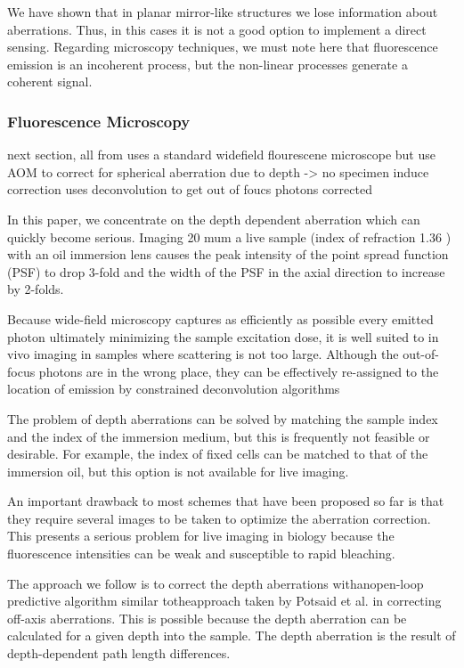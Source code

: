 We have shown that in planar mirror-like structures we lose information about aberrations. Thus, in this cases it is not a good option to implement a direct sensing. Regarding microscopy techniques, we must note here that fluorescence emission is an incoherent process, but the non-linear processes generate a coherent signal.


\subsubsection{Fluorescence Microscopy}
\label{sec:FlourescnecMicroscopy}

next section, all from \cite{wide_AOM_FM_spehrical_correction} uses a 
standard widefield flourescene microscope but use AOM to correct for 
spherical aberration due to depth -> no specimen induce correction
uses deconvolution to get out of foucs photons corrected

In this paper, we concentrate on the depth dependent aberration which can 
quickly become serious. Imaging 20 mum a live sample (index of refraction 1.36
) with an oil immersion lens causes the peak intensity of the point spread 
function (PSF) to drop 3-fold and the width of the PSF in the axial direction 
to increase by 2-folds. \cite{wide_AOM_FM_spehrical_correction} 

Because wide-field microscopy captures as efficiently as possible every 
emitted photon ultimately minimizing the sample excitation dose, it is well 
suited to in vivo imaging in samples where scattering is not too large. 
Although the out-of-focus photons are in the wrong place, they can be 
effectively re-assigned to the location of emission by constrained 
deconvolution algorithms \cite{wide_deconvolution}

The problem of depth aberrations can be solved by matching the sample index 
and the index of the immersion medium, but this is frequently not feasible or 
desirable. For example, the index of fixed cells can be matched to that of 
the immersion oil, but this option is not available for live imaging.

An important drawback to most schemes that have been proposed so far is that 
they require several images to be taken to optimize the aberration 
correction. This presents a serious problem for live imaging in biology 
because the fluorescence intensities can be weak and susceptible to rapid 
bleaching.

The approach we follow is to correct the depth aberrations withanopen-loop 
predictive algorithm similar totheapproach taken by Potsaid et al. in 
correcting off-axis aberrations. This is possible because the depth 
aberration can be calculated for a given depth into the sample. The depth 
aberration is the result of depth-dependent path length differences.

